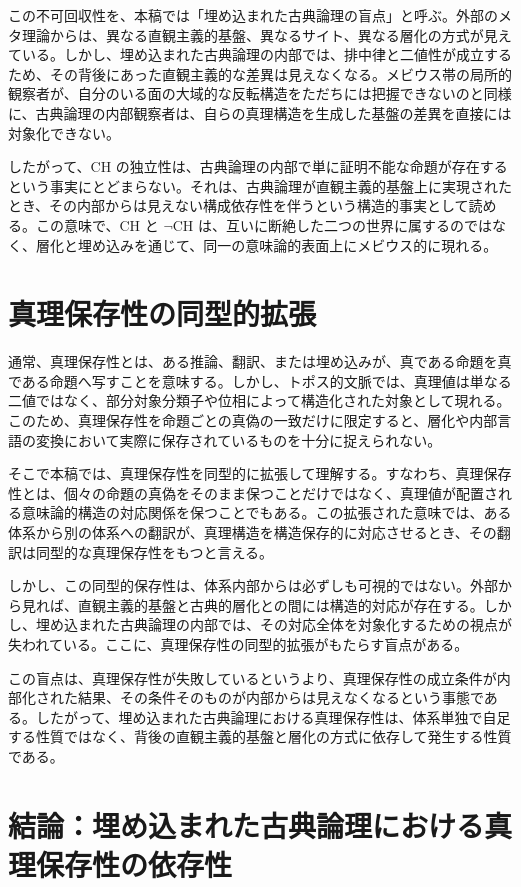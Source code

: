 \documentclass[11pt]{ltjsarticle}
\begin{document}
この不可回収性を、本稿では「埋め込まれた古典論理の盲点」と呼ぶ。外部のメタ理論からは、異なる直観主義的基盤、異なるサイト、異なる層化の方式が見えている。しかし、埋め込まれた古典論理の内部では、排中律と二値性が成立するため、その背後にあった直観主義的な差異は見えなくなる。メビウス帯の局所的観察者が、自分のいる面の大域的な反転構造をただちには把握できないのと同様に、古典論理の内部観察者は、自らの真理構造を生成した基盤の差異を直接には対象化できない。

したがって、CH の独立性は、古典論理の内部で単に証明不能な命題が存在するという事実にとどまらない。それは、古典論理が直観主義的基盤上に実現されたとき、その内部からは見えない構成依存性を伴うという構造的事実として読める。この意味で、CH と $\neg\mathrm{CH}$ は、互いに断絶した二つの世界に属するのではなく、層化と埋め込みを通じて、同一の意味論的表面上にメビウス的に現れる。

\section{真理保存性の同型的拡張}

通常、真理保存性とは、ある推論、翻訳、または埋め込みが、真である命題を真である命題へ写すことを意味する。しかし、トポス的文脈では、真理値は単なる二値ではなく、部分対象分類子や位相によって構造化された対象として現れる。このため、真理保存性を命題ごとの真偽の一致だけに限定すると、層化や内部言語の変換において実際に保存されているものを十分に捉えられない。

そこで本稿では、真理保存性を同型的に拡張して理解する。すなわち、真理保存性とは、個々の命題の真偽をそのまま保つことだけではなく、真理値が配置される意味論的構造の対応関係を保つことでもある。この拡張された意味では、ある体系から別の体系への翻訳が、真理構造を構造保存的に対応させるとき、その翻訳は同型的な真理保存性をもつと言える。

しかし、この同型的保存性は、体系内部からは必ずしも可視的ではない。外部から見れば、直観主義的基盤と古典的層化との間には構造的対応が存在する。しかし、埋め込まれた古典論理の内部では、その対応全体を対象化するための視点が失われている。ここに、真理保存性の同型的拡張がもたらす盲点がある。

この盲点は、真理保存性が失敗しているというより、真理保存性の成立条件が内部化された結果、その条件そのものが内部からは見えなくなるという事態である。したがって、埋め込まれた古典論理における真理保存性は、体系単独で自足する性質ではなく、背後の直観主義的基盤と層化の方式に依存して発生する性質である。

\section{結論：埋め込まれた古典論理における真理保存性の依存性}
\end{document}
